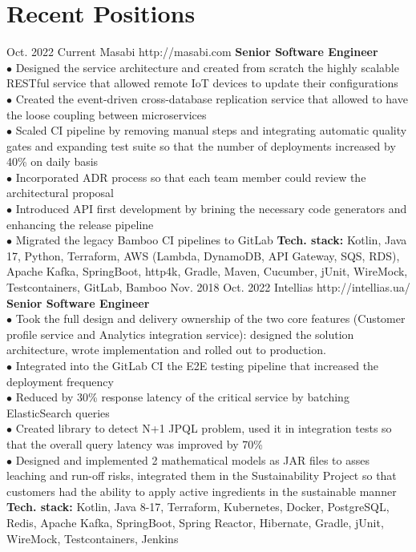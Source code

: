 \documentclass[10pt]{article} %
\begin{document}
\section{Recent Positions}
\job
{Oct. 2022 }{ Current}
{Masabi}
{http://masabi.com}
{\textbf{Senior Software Engineer}}
{
\textbf{}   
\\$\bullet$ Designed the service architecture and created from scratch the highly scalable RESTful service that allowed remote IoT devices to update their configurations	
\\$\bullet$ Created the event-driven cross-database replication service that allowed to have the loose coupling between microservices
\\$\bullet$ Scaled CI pipeline by removing manual steps and integrating automatic quality gates and expanding test suite so that the number of deployments increased by 40\% on daily basis 
\\$\bullet$ Incorporated ADR process so that each team member could review the architectural proposal
\\$\bullet$ Introduced API first development by brining the necessary code generators and enhancing the release pipeline
\\$\bullet$ Migrated the legacy Bamboo CI pipelines to GitLab
\vadjust{\vspace{4pt}}
\newline
\textbf{Tech. stack: }{Kotlin, Java 17, Python, Terraform, AWS (Lambda, DynamoDB, API Gateway, SQS, RDS), Apache Kafka, SpringBoot, http4k, Gradle, Maven, Cucumber, jUnit, WireMock, Testcontainers, GitLab, Bamboo}   
 }
\job
{Nov. 2018 }{ Oct. 2022}
{Intellias}
{http://intellias.ua/}
{\textbf{Senior Software Engineer}}
{
\textbf{}   
\\$\bullet$ Took the full design and delivery ownership of the two core features (Customer profile service and Analytics integration service): designed the solution architecture, wrote implementation and rolled out to production. 
\\$\bullet$ Integrated into the GitLab CI the E2E testing pipeline that increased the deployment frequency
\\$\bullet$ Reduced by 30\% response latency of the critical service by batching ElasticSearch queries 
\\$\bullet$ Created library to detect N+1 JPQL problem, used it in integration tests so that the overall query latency was improved by 70\% 
\\$\bullet$ Designed and implemented 2 mathematical models as JAR files to asses leaching and run-off risks, 
integrated them in the Sustainability Project so that customers had the ability to apply active ingredients in the sustainable manner
\vadjust{\vspace{4pt}}
\newline
\textbf{Tech. stack: }{Kotlin, Java 8-17, Terraform, Kubernetes, Docker, PostgreSQL, Redis, Apache Kafka, SpringBoot, Spring Reactor, Hibernate, Gradle, jUnit, WireMock, Testcontainers, Jenkins}   
 }
\end{document}
